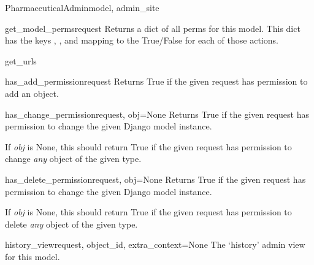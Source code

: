 \documentclass[letterpaper,10pt,english]{sphinxmanual}
\begin{document}
\begin{classdesc}{PharmaceuticalAdmin}{model, admin\_site}
\hypertarget{data.admin.PharmaceuticalAdmin.get_model_perms}{}\begin{methoddesc}{get\_model\_perms}{request}
Returns a dict of all perms for this model. This dict has the keys
, , and  mapping to the True/False for each
of those actions.
\end{methoddesc}

\hypertarget{data.admin.PharmaceuticalAdmin.get_urls}{}\begin{methoddesc}{get\_urls}{}\end{methoddesc}

\hypertarget{data.admin.PharmaceuticalAdmin.has_add_permission}{}\begin{methoddesc}{has\_add\_permission}{request}
Returns True if the given request has permission to add an object.
\end{methoddesc}

\hypertarget{data.admin.PharmaceuticalAdmin.has_change_permission}{}\begin{methoddesc}{has\_change\_permission}{request, obj=None}
Returns True if the given request has permission to change the given
Django model instance.

If \emph{obj} is None, this should return True if the given request has
permission to change \emph{any} object of the given type.
\end{methoddesc}

\hypertarget{data.admin.PharmaceuticalAdmin.has_delete_permission}{}\begin{methoddesc}{has\_delete\_permission}{request, obj=None}
Returns True if the given request has permission to change the given
Django model instance.

If \emph{obj} is None, this should return True if the given request has
permission to delete \emph{any} object of the given type.
\end{methoddesc}

\hypertarget{data.admin.PharmaceuticalAdmin.history_view}{}\begin{methoddesc}{history\_view}{request, object\_id, extra\_context=None}
The `history' admin view for this model.
\end{methoddesc}


\end{classdesc}
\end{document}
